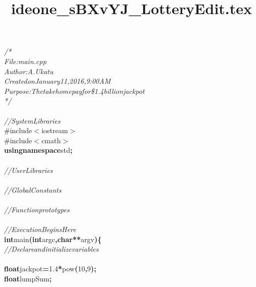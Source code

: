 \documentclass[a4paper, 10pt]{article}
\title{ideone_sBXvYJ_LotteryEdit.tex}
\newcommand\SPC{\hspace*{0.6em}}
\newcommand{\CppAComment}[1]{\textit{\textcolor[rgb]{0.2,0.6,1}{#1}}}
\newcommand{\CppAFloat}[1]{\textcolor[rgb]{0.5,0,0.5}{#1}}
\newcommand{\CppAIdentifier}[1]{#1}
\newcommand{\CppANumber}[1]{\textcolor[rgb]{0.5,0,0.5}{#1}}
\newcommand{\CppAPreprocessor}[1]{\textcolor[rgb]{0,0.5,0}{#1}}
\newcommand{\CppAReservedWord}[1]{\textbf{#1}}
\newcommand{\CppASpace}[1]{\colorbox[rgb]{1,1,1}{#1}}
\newcommand{\CppASymbol}[1]{\textbf{\textcolor[rgb]{1,0,0}{#1}}}
\begin{document}
\begin{ttfamily}
\noindent
\CppAComment{/*\SPC }\\
\CppAComment{\SPC \SPC \SPC \SPC File:\SPC \SPC \SPC main.cpp}\\
\CppAComment{\SPC \SPC \SPC \SPC Author:\SPC A.\SPC Ukatu}\\
\CppAComment{\SPC \SPC \SPC \SPC Created\SPC on\SPC January\SPC 11,\SPC 2016,\SPC 9:00\SPC AM}\\
\CppAComment{\SPC \SPC \SPC \SPC Purpose:\SPC The\SPC takehome\SPC pay\SPC for\SPC \$1.4\SPC billion\SPC jackpot}\\
\CppAComment{\SPC \SPC */}\\
\\
\CppAComment{//System\SPC Libraries}\\
\CppAPreprocessor{\#include\SPC $<$iostream$>$}\\
\CppAPreprocessor{\#include\SPC $<$cmath$>$}\\
\CppAReservedWord{using}\CppASpace{\SPC }\CppAReservedWord{namespace}\CppASpace{\SPC }\CppAIdentifier{std}\CppASymbol{;}\\
\\
\CppAComment{//User\SPC Libraries}\\
\\
\CppAComment{//Global\SPC Constants}\\
\\
\CppAComment{//Function\SPC prototypes}\\
\\
\CppAComment{//Execution\SPC Begins\SPC Here}\\
\CppAReservedWord{int}\CppASpace{\SPC }\CppAIdentifier{main}\CppASymbol{(}\CppAReservedWord{int}\CppASpace{\SPC }\CppAIdentifier{argc}\CppASymbol{,}\CppASpace{\SPC }\CppAReservedWord{char}\CppASymbol{*}\CppASymbol{*}\CppASpace{\SPC }\CppAIdentifier{argv}\CppASymbol{)}\CppASpace{\SPC }\CppASymbol{\{}\\
\CppASpace{\SPC \SPC \SPC \SPC }\CppAComment{//Declare\SPC and\SPC initialize\SPC variables}\\
\CppASpace{\SPC \SPC \SPC \SPC }\\
\CppASpace{\SPC \SPC \SPC \SPC }\CppAReservedWord{float}\CppASpace{\SPC }\CppAIdentifier{jackpot}\CppASymbol{=}\CppAFloat{1.4}\CppASymbol{*}\CppAIdentifier{pow}\CppASymbol{(}\CppANumber{10}\CppASymbol{,}\CppANumber{9}\CppASymbol{)}\CppASymbol{;}\\
\CppASpace{\SPC \SPC \SPC \SPC }\CppAReservedWord{float}\CppASpace{\SPC }\CppAIdentifier{lumpSum}\CppASymbol{;}\\

\end{ttfamily}
\end{document}
